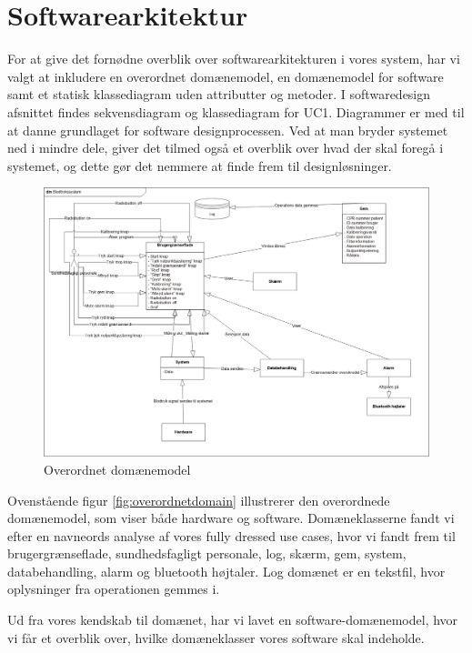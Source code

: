 \section{Softwarearkitektur}
For at give det fornødne overblik over  softwarearkitekturen i vores system, har vi valgt at inkludere en overordnet domænemodel, en domænemodel for software samt et statisk klassediagram uden attributter og metoder. I softwaredesign afsnittet  findes sekvensdiagram og klassediagram for UC1. Diagrammer er med til at danne grundlaget for software designprocessen. Ved at man bryder systemet ned i mindre dele, giver det tilmed også et overblik over hvad der skal foregå i systemet, og dette gør det nemmere at finde frem til designløsninger.

\begin{figure}[h!]
	\centering
	\includegraphics[width=1\linewidth]{Arkitektur_og_design/Softwarearkitektur/overordnetdomain}	
	\caption{Overordnet domænemodel}
	\label{fig:overordnetdomain}
\end{figure}

Ovenstående figur \vref{fig:overordnetdomain} illustrerer den overordnede domænemodel, som viser både hardware og software. Domæneklasserne fandt vi efter en navneords analyse af vores fully dressed use cases, hvor vi fandt frem til brugergrænseflade, sundhedsfagligt personale, log, skærm, gem, system, databehandling, alarm og bluetooth højtaler.  Log domænet er en tekstfil, hvor oplysninger fra operationen gemmes i.


  
Ud fra vores kendskab til domænet, har vi lavet en software-domænemodel, hvor vi får et overblik over, hvilke domæneklasser vores software skal indeholde. 

